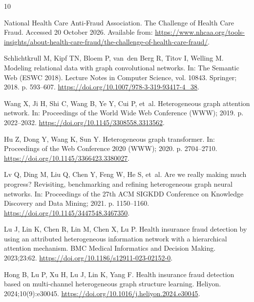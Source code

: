 \documentclass[pdflatex,sn-vancouver-num]{sn-jnl}
\begin{document}
\clearpage

\begin{thebibliography}{10}
\providecommand{\doi}[1]{\url{https://doi.org/#1}}
\bibcommenthead

{National Health Care Anti-Fraud Association}. The Challenge of Health Care
  Fraud.
\newblock Accessed 20 October 2026.
\newblock Available from:
  \url{https://www.nhcaa.org/tools-insights/about-health-care-fraud/the-challenge-of-health-care-fraud/}.

Schlichtkrull M, Kipf TN, Bloem P, van~den Berg R, Titov I, Welling M.
\newblock Modeling relational data with graph convolutional networks.
\newblock In: The Semantic Web (ESWC 2018). Lecture Notes in Computer Science,
  vol. 10843. Springer; 2018. p. 593--607.
\newblock \doi{10.1007/978-3-319-93417-4_38}.

Wang X, Ji H, Shi C, Wang B, Ye Y, Cui P, et~al.
\newblock Heterogeneous graph attention network.
\newblock In: Proceedings of the World Wide Web Conference (WWW); 2019. p.
  2022--2032.
\newblock \doi{10.1145/3308558.3313562}.

Hu Z, Dong Y, Wang K, Sun Y.
\newblock Heterogeneous graph transformer.
\newblock In: Proceedings of the Web Conference 2020 (WWW); 2020. p.
  2704--2710.
\newblock \doi{10.1145/3366423.3380027}.

Lv Q, Ding M, Liu Q, Chen Y, Feng W, He S, et~al.
\newblock Are we really making much progress? {R}evisiting, benchmarking and
  refining heterogeneous graph neural networks.
\newblock In: Proceedings of the 27th ACM SIGKDD Conference on Knowledge
  Discovery and Data Mining; 2021. p. 1150--1160.
\newblock \doi{10.1145/3447548.3467350}.

Lu J, Lin K, Chen R, Lin M, Chen X, Lu P.
\newblock Health insurance fraud detection by using an attributed heterogeneous
  information network with a hierarchical attention mechanism.
\newblock BMC Medical Informatics and Decision Making. 2023;23:62.
\newblock \doi{10.1186/s12911-023-02152-0}.

Hong B, Lu P, Xu H, Lu J, Lin K, Yang F.
\newblock Health insurance fraud detection based on multi-channel heterogeneous
  graph structure learning.
\newblock Heliyon. 2024;10(9):e30045.
\newblock \doi{10.1016/j.heliyon.2024.e30045}.


\end{thebibliography}
\end{document}
